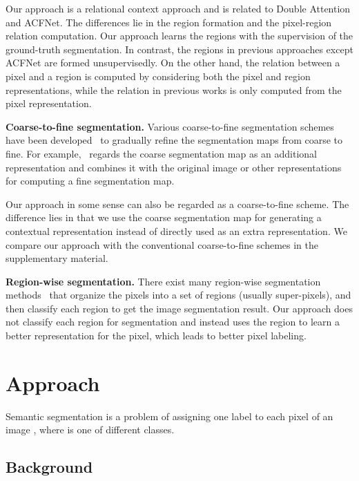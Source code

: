 \documentclass[runningheads]{llncs}
\begin{document}
Our approach is a relational context approach
and is related to Double Attention and ACFNet.
The differences lie in the region formation and 
the pixel-region relation computation.
Our approach learns the regions with
the supervision of
the ground-truth segmentation.
In contrast,
the regions in previous approaches
except ACFNet
are formed unsupervisedly.
On the other hand,
the relation between a pixel and a region
is computed by considering both the pixel and region representations,
while the relation in previous works is only computed
from the pixel representation.

\noindent\textbf{Coarse-to-fine segmentation.}
Various coarse-to-fine segmentation schemes have been developed~\cite{fieraru2018learning,gidaris2017detect,li2016iterative,tu2010auto,islam2017label,kuo2019shapemask,zhu20183d}
to gradually refine the segmentation maps
from coarse to fine.
For example,~\cite{li2016iterative} 
regards the coarse segmentation map
as an additional representation
and combines it with the original image or other representations
for computing a fine segmentation map.

Our approach in some sense can also be regarded
as a coarse-to-fine scheme.
The difference lies in that we use the coarse segmentation map
for generating a contextual representation
instead of directly used as an extra representation.
We compare our approach with the conventional coarse-to-fine
schemes in the supplementary material.


\noindent\textbf{Region-wise segmentation.} 
There exist many region-wise segmentation methods~\cite{arbelaez2012semantic,caesar2016region,gu2009recognition,gould2009decomposing,wei2017object,neuhold2017mapillary,caesar2016region,uijlings2013selective} that 
organize the pixels into a set of regions (usually super-pixels),
and then classify each region to get the image segmentation result.
Our approach does not classify each region for segmentation
and instead uses the region to learn a better representation for the pixel, which leads to better pixel labeling.


\section{Approach}
Semantic segmentation is a problem of assigning one label  
to each pixel  of an image , 
where  is one of  different classes.

\subsection{Background}
\end{document}
